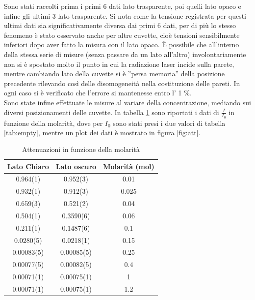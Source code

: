 \documentclass[10pt,letterpaper]{article}
\begin{document}
Sono stati raccolti prima i primi 6 dati lato trasparente, poi quelli lato opaco e infine gli ultimi 3 lato trasparente. Si nota come la tensione registrata per questi ultimi dati sia significativamente diversa dai primi 6 dati, per di più lo stesso fenomeno è stato osservato anche per altre cuvette, cioè tensioni sensibilmente inferiori dopo aver fatto la misura con il lato opaco. È possibile che all'interno della stessa serie di misure (senza passare da un lato all'altro) involontariamente non si è spostato molto il punto in cui la radiazione laser incide sulla parete, mentre cambiando lato della cuvette si è ''persa memoria'' della posizione precedente rilevando così delle disomogeneità nella costituzione delle pareti. In ogni caso si è verificato che l'errore si mantenesse entro l' 1 $\%$.\\
Sono state infine effettuate le misure al variare della concentrazione, mediando sui diversi posizionamenti delle cuvette. In tabella \ref{tab:att} sono riportati i dati di $\frac{I}{I_0}$ in funzione della molarità, dove per $I_0$ sono stati presi i due valori di tabella \ref{tab:empty}, mentre un plot dei dati è mostrato in figura \ref{fig:att}.

\begin{table}[htp]
\centering
\caption{Attenuazioni in funzione della molarità}
\label{tab:att}
\begin{tabular}{c|c|c}
\hline 
\textbf{Lato Chiaro} & \textbf{Lato oscuro} & \textbf{Molarità (mol)}\\ 	
\hline 
0.964(1) & 0.952(3) & 0.01 \\ 

0.932(1) & 0.912(3) & 0.025 \\ 

0.659(3) & 0.521(2) & 0.04 \\ 

0.504(1) & 0.3590(6) & 0.06 \\ 

0.211(1) & 0.1487(6) & 0.1 \\ 

0.0280(5) & 0.0218(1) & 0.15 \\ 

0.00083(5) & 0.00085(5) & 0.25 \\ 

0.00077(5) & 0.00082(5) & 0.4 \\ 

0.00071(1) & 0.00075(1) & 1 \\ 

0.00071(1) & 0.00075(1) & 1.2 \\
\hline  
\end{tabular} 
\end{table}
\end{document}
